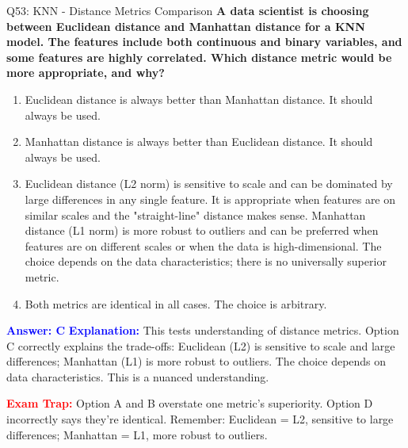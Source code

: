 \documentclass[8pt]{beamer}
\begin{document}
	\begin{frame}{Q53: KNN - Distance Metrics Comparison}
		\fontsize{6.5}{7.5}\selectfont
		\textbf{A data scientist is choosing between Euclidean distance and Manhattan distance for a KNN model. The features include both continuous and binary variables, and some features are highly correlated. Which distance metric would be more appropriate, and why?}
		
		\begin{enumerate}
			\item Euclidean distance is always better than Manhattan distance. It should always be used.
			\item Manhattan distance is always better than Euclidean distance. It should always be used.
			\item Euclidean distance (L2 norm) is sensitive to scale and can be dominated by large differences in any single feature. It is appropriate when features are on similar scales and the "straight-line" distance makes sense. Manhattan distance (L1 norm) is more robust to outliers and can be preferred when features are on different scales or when the data is high-dimensional. The choice depends on the data characteristics; there is no universally superior metric.
			\item Both metrics are identical in all cases. The choice is arbitrary.
		\end{enumerate}
		
		\vspace{0.1cm}
		\textcolor{blue}{\textbf{Answer: C}}
		\vspace{0.1cm}
		\textcolor{blue}{\textbf{Explanation:}} This tests understanding of distance metrics. Option C correctly explains the trade-offs: Euclidean (L2) is sensitive to scale and large differences; Manhattan (L1) is more robust to outliers. The choice depends on data characteristics. This is a nuanced understanding.
		
		\textcolor{red}{\textbf{Exam Trap:}} Option A and B overstate one metric's superiority. Option D incorrectly says they're identical. Remember: Euclidean = L2, sensitive to large differences; Manhattan = L1, more robust to outliers.
	\end{frame}
	
\end{document}
